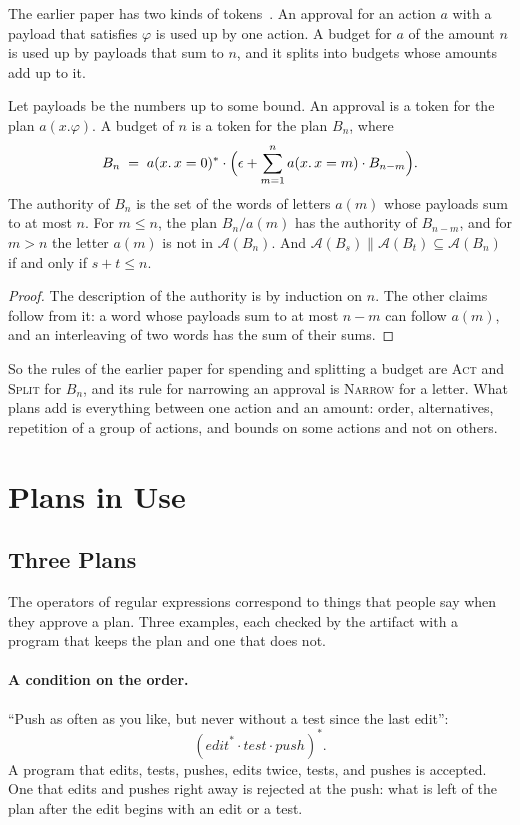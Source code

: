 \documentclass[acmsmall,nonacm,screen]{acmart}
\newcommand{\nm}[1]{\mathit{#1}}
\newcommand{\auth}[1]{\mathcal{A}(#1)}
\newcommand{\sh}{\mathbin{\parallel}}
\newcommand{\edit}{\nm{edit}}
\newcommand{\test}{\nm{test}}
\newcommand{\push}{\nm{push}}
\begin{document}
The earlier paper has two kinds of tokens~\citep{tpp4}. An approval for an action $a$ with a
payload that satisfies $\varphi$ is used up by one action. A budget for $a$ of the amount $n$
is used up by payloads that sum to $n$, and it splits into budgets whose amounts add up to
it.

\begin{proposition}[Instances]
\label{prop:instances}
Let payloads be the numbers up to some bound. An approval is a token for the plan
$a(x.\varphi)$. A budget of $n$ is a token for the plan $B_n$, where
\[
B_n \;=\; a(x.\,x = 0)^{*} \cdot \Bigl(\epsilon + \sum_{m = 1}^{n} a(x.\,x = m) \cdot B_{n - m}\Bigr).
\]
The authority of $B_n$ is the set of the words of letters $a(m)$ whose payloads sum to at
most $n$. For $m \le n$, the plan $B_n / a(m)$ has the authority of $B_{n - m}$, and for
$m > n$ the letter $a(m)$ is not in $\auth{B_n}$. And
$\auth{B_s} \sh \auth{B_t} \subseteq \auth{B_n}$ if and only if $s + t \le n$.
\end{proposition}

\begin{proof}
The description of the authority is by induction on $n$. The other claims follow from it: a
word whose payloads sum to at most $n - m$ can follow $a(m)$, and an interleaving of two
words has the sum of their sums.
\end{proof}

So the rules of the earlier paper for spending and splitting a budget are \textsc{Act} and
\textsc{Split} for $B_n$, and its rule for narrowing an approval is \textsc{Narrow} for a
letter. What plans add is everything between one action and an amount: order, alternatives,
repetition of a group of actions, and bounds on some actions and not on others.

\section{Plans in Use}
\label{sec:use}

\subsection{Three Plans}

The operators of regular expressions correspond to things that people say when they approve
a plan. Three examples, each checked by the artifact with a program that keeps the plan and
one that does not.

\paragraph{A condition on the order.} ``Push as often as you like, but never without a test
since the last edit'':
\[
(\edit^{*} \cdot \test \cdot \push)^{*}.
\]
A program that edits, tests, pushes, edits twice, tests, and pushes is accepted. One that
edits and pushes right away is rejected at the push: what is left of the plan after the edit
begins with an edit or a test.
\end{document}
